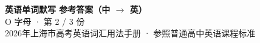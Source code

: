 \documentclass[10pt,a4paper]{article}
\begin{document}
\pagestyle{plain}

\begin{center}
{\LARGE\bfseries 英语单词默写 \quad 参考答案（中 $\to$ 英）}\\[0.22em]
{\large O 字母 · 第 2 / 3 份}\\[0.18em]
{\small 2026年上海市高考英语词汇用法手册 · 参照普通高中英语课程标准}
\end{center}

\vspace{0.2em}
\noindent{\color{rulegray}\rule{\textwidth}{0.8pt}}

\vspace{0.35em}

\vspace{0.25em}
\renewcommand{\arraystretch}{1.32}
\end{document}
